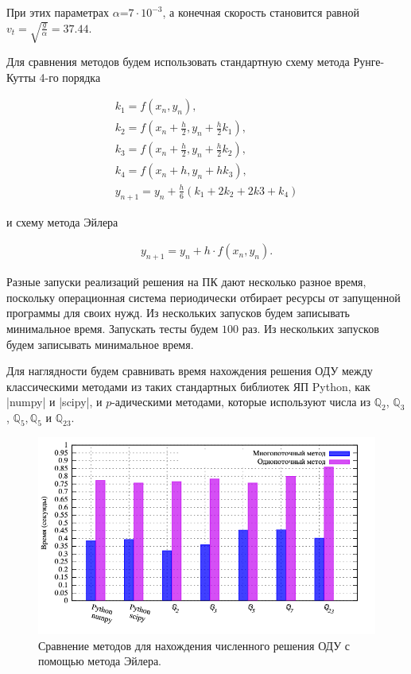\documentclass[master, och, diploma, times]{sty/SCWorks}
\theoremstyle{plain}
\theoremstyle{definition}
\numberwithin{equation}{section}
\begin{document}
При этих параметрах $\alpha$=$7 \cdot 10^{-3}$, а конечная скорость становится равной $v_t=\sqrt{\frac{g}{\alpha}}=37.44$.

Для сравнения методов будем использовать стандартную схему метода Рунге-Кутты 4-го порядка

\begin{equation}%
\begin{aligned}
k_1 = f(x_n, y_n), \\
k_2 = f(x_n+\frac{h}{2}, y_n+\frac{h}{2}k_1), \\
k_3 = f(x_n+\frac{h}{2}, y_n+\frac{h}{2}k_2), \\
k_4 = f(x_n+h, y_n+hk_3), \\
y_{n+1}=y_n+\frac{h}{6}(k_1+2k_2+2k3+k_4)
\end{aligned}
\end{equation}


\noindent и схему метода Эйлера

\begin{equation}%
\begin{aligned}
y_{n+1}=y_n+h \cdot f(x_n, y_n).
\end{aligned}
\end{equation}


Разные запуски реализаций решения на ПК дают несколько разное время, поскольку операционная система периодически отбирает ресурсы от запущенной программы для своих нужд. Из нескольких запусков будем записывать минимальное время. Запускать тесты будем $100$ раз. Из нескольких запусков будем записывать минимальное время.

Для наглядности будем сравнивать время нахождения решения ОДУ между классическими методами из таких стандартных библиотек ЯП Python, как |numpy| и |scipy|, и $p$-адическими методами, которые используют числа из $\mathbb{Q}_2$, $\mathbb{Q}_3$, $\mathbb{Q}_5, \mathbb{Q}_5$ и $\mathbb{Q}_{23}$.

\begin{figure}[H]
\centerline{\includegraphics[width=0.85\linewidth]{../gnuplot/multi/euler/plot.png}}
\caption{Сравнение методов для нахождения численного решения ОДУ с помощью метода Эйлера.}
\label{img:multi:ode:euler}
\end{figure}
\end{document}
